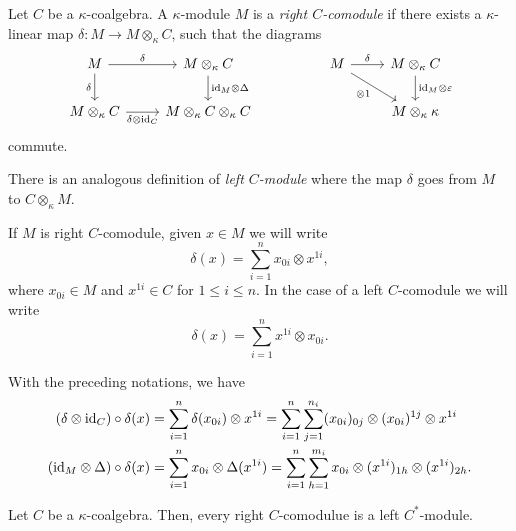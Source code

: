 \begin{defn}
    Let $C$ be a $\kappa$-coalgebra. A $\kappa$-module $M$ is a \textsl{right $C$-comodule} if there exists a $\kappa$-linear map $\delta\colon M\to M\otimes_\kappa C$, such that the diagrams
    $$
        \begin{tikzcd}
            M
                    \arrow[d,"\delta"']
                    \arrow[r,"\delta"]
                &M\otimes_\kappa C
                    \arrow[d,"\id_M\otimes\Delta"]
                &&M
                    \arrow[r,"\delta"]
                    \arrow[rd,"\otimes1"']
                &M\otimes_\kappa C
                    \arrow[d,"\id_M\otimes\varepsilon"]\\
            M\otimes_\kappa C
                    \arrow[r,"\delta\otimes\id_C"']
                &M\otimes_\kappa C\otimes_\kappa C
                &&&M\otimes_\kappa\kappa
        \end{tikzcd}
    $$
    commute.
\end{defn}

\begin{rem}
    There is an analogous definition of \textsl{left $C$-module} where the map $\delta$ goes from $M$ to $C\otimes_\kappa M$.
\end{rem}

\begin{ntn}
    If\/ $M$ is right\/ $C$-comodule, given\/ $x\in M$ we will write
    $$
        \delta(x) = \sum_{i=1}^nx_{0i}\otimes x^{1i},
    $$
    where\/ $x_{0i}\in M$ and\/ $x^{1i}\in C$ for\/ $1\le i\le n$. In the case of a left\/ $C$-comodule we will write
    $$
        \delta(x) = \sum_{i=1}^nx^{1i}\otimes x_{0i}.
    $$
\end{ntn}

\begin{rem}\label{rem:right-comodule}
    With the preceding notations, we have
    \begin{align*}
        (\delta\otimes\text{\rm id}_C)\circ\delta(x)
            &= \sum_{i=1}^n\delta(x_{0i})\otimes x^{1i}
            = \sum_{i=1}^n\sum_{j=1}^{n_i}
                (x_{0i})_{0j}\otimes(x_{0i})^{1j}\otimes x^{1i}\\
        (\text{\rm id}_M\otimes\Delta)\circ\delta(x)
            &= \sum_{i=1}^nx_{0i}\otimes\Delta(x^{1i})
            = \sum_{i=1}^n\sum_{h=1}^{m_i}
                x_{0i}\otimes(x^{1i})_{1h}\otimes(x^{1i})_{2h}.
    \end{align*}
\end{rem}


\begin{prop}\label{prop:c-comodule-is-left-dual-comodule}
    Let $C$ be a $\kappa$-coalgebra. Then, every right\/ $C$-comodulue is a left\/ $C^*$-module.
\end{prop}

